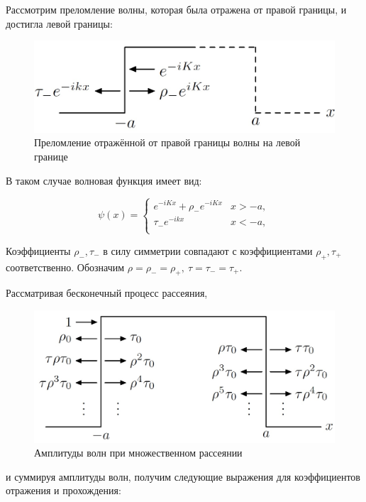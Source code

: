 \documentclass[a4 paper, 12 pt]{extarticle}
\begin{document}
   Рассмотрим преломление волны, которая была отражена от правой границы, и достигла левой границы:
   
   \begin{figure}[!htb]
   	\centering
   	\includegraphics[scale=0.25]{reflect3.jpg}
   	\caption{Преломление отражённой от правой границы волны на левой границе}
   \end{figure}

   В таком случае волновая функция имеет вид:
   
   \[
   \psi(x)=\left\{%
   \begin{array}{ll}
   e^{-iKx}+\rho_-e^{-iKx} & x>-a, \\
   \tau_-e^{-ikx} & x<-a, \\
   \end{array}%
   \right.
   \]
   
   Коэффициенты $\rho_-, \tau_-$ в силу симметрии совпадают с коэффициентами $\rho_+, \tau_+$ соответственно. Обозначим $\rho = \rho_- = \rho_+, \ \tau = \tau_- = \tau_+$.
   
   \pagebreak
   Рассматривая бесконечный процесс рассеяния,
   
   \begin{figure}[!htb]
   	\centering
   	\includegraphics[scale=0.25]{reflect4.jpg}
   	\caption{Амплитуды волн при множественном рассеянии}
   \end{figure}

   и суммируя амплитуды волн, получим следующие выражения для коэффициентов отражения и прохождения:
   
\end{document}
